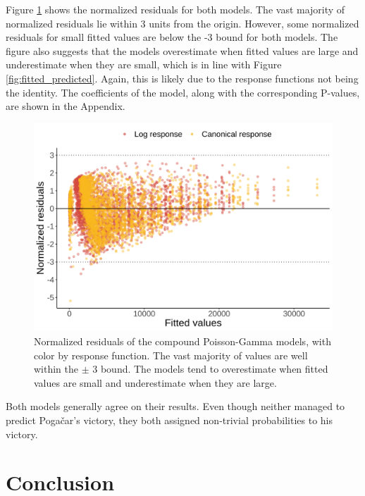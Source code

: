 \documentclass[aos,preprint]{imsart}
\begin{document}
Figure \ref{fig:norm_res} shows the normalized residuals for both models. The vast majority of normalized residuals lie within 3 units from the origin. However, some normalized residuals for small fitted values are below the -3 bound for both models. The figure also suggests that the models overestimate when fitted values are large and underestimate when they are small, which is in line with Figure \ref{fig:fitted_predicted}. Again, this is likely due to the response functions not being the identity. The coefficients of the  model, along with the corresponding P-values, are shown in the Appendix.




\begin{figure}[h]
  \centering
  \includegraphics[scale=0.65]{fig/norm_res_comparison.png}
  \caption{Normalized residuals of the compound Poisson-Gamma models, with color by response function. The vast majority of values are well within the $\pm$ 3 bound. The models tend to overestimate when fitted values are small and underestimate when they are large.}
  \label{fig:norm_res}
\end{figure}


Both models generally agree on their results. Even though neither managed to predict Pogačar's victory, they both assigned non-trivial probabilities to his victory.


\section{Conclusion} \label{sec:conclusion}
\end{document}
